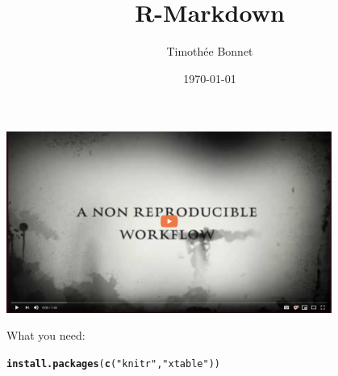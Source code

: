 \documentclass[10pt]{beamer}\usepackage[]{graphicx}\usepackage[]{color}
\title{R-Markdown}
\author{Timoth\'ee Bonnet}
\institute{BDSI / RSB}
\date{\today}
\makeatletter
\newcommand{\hlstr}[1]{\textcolor[rgb]{0.192,0.494,0.8}{#1}}%
\newcommand{\hlstd}[1]{\textcolor[rgb]{0.345,0.345,0.345}{#1}}%
\newcommand{\hlkwd}[1]{\textcolor[rgb]{0.737,0.353,0.396}{\textbf{#1}}}%
\newenvironment{kframe}{%
 \def\at@end@of@kframe{}%
 \ifinner\ifhmode%
  \def\at@end@of@kframe{\end{minipage}}%
  \begin{minipage}{\columnwidth}%
 \fi\fi%
 \def\FrameCommand##1{\hskip\@totalleftmargin \hskip-\fboxsep
 \colorbox{shadecolor}{##1}\hskip-\fboxsep
     \hskip-\linewidth \hskip-\@totalleftmargin \hskip\columnwidth}%
 \MakeFramed {\advance\hsize-\width
   \@totalleftmargin\z@ \linewidth\hsize
   \@setminipage}}%
 {\par\unskip\endMakeFramed%
 \at@end@of@kframe}
\newenvironment{knitrout}{}{} %
\makeatother
\begin{document}
\begin{frame}
\centering
\href{https://www.youtube.com/watch?v=s3JldKoA0zw}{\includegraphics[width=0.8\textwidth]{Figures/markdownyoutube.png}}

\end{frame}

\begin{frame}
\maketitle
\end{frame}

\begin{frame}{What you need:}

\begin{knitrout}\small
{}\color{fgcolor}\begin{kframe}
\begin{alltt}
\hlkwd{install.packages}\hlstd{(}\hlkwd{c}\hlstd{(}\hlstr{"knitr"}\hlstd{,} \hlstr{"xtable"}\hlstd{))}
\end{alltt}
\end{kframe}
\end{knitrout}

\end{frame}
\end{document}
